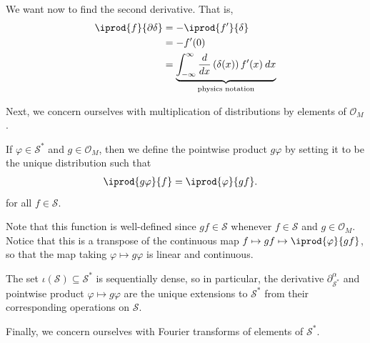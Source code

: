 \documentclass[10pt]{mypackage}
\begin{document}
\begin{example}
  We want now to find the second derivative. That is,
  \begin{align*}
    \iprod{f}{\partial \delta} &= - \iprod{f'}{\delta}\\
                               &= - f'(0)\\
                               &= \underbrace{\int_{-\infty}^{\infty} \frac{d}{dx}\left( \delta(x) \right)f'(x)\:dx}_{\text{physics notation}}
  \end{align*}
\end{example}
Next, we concern ourselves with multiplication of distributions by elements of $\mathcal{O}_M$. 
\begin{definition}
  If $\varphi\in \mathcal{S}^{\ast}$ and $g\in \mathcal{O}_M$, then we define the pointwise product $g\varphi$ by setting it to be the unique distribution such that
  \begin{align*}
    \iprod{g\varphi}{f} &= \iprod{\varphi}{gf}.
  \end{align*}
  for all $f\in \mathcal{S}$.
\end{definition}
Note that this function is well-defined since $gf\in \mathcal{S}$ whenever $f\in \mathcal{S}$ and $g\in \mathcal{O}_M$. Notice that this is a transpose of the continuous map $f\mapsto gf \mapsto \iprod{\varphi}{gf}$, so that the map taking $\varphi\mapsto g\varphi$ is linear and continuous.
\begin{remark}
  The set $\iota\left( \mathcal{S} \right)\subseteq \mathcal{S}^{\ast}$ is sequentially dense, so in particular, the derivative $\partial^{\alpha}_{\mathcal{S}^{\ast}}$ and pointwise product $\varphi\mapsto g\varphi$ are the unique extensions to $\mathcal{S}^{\ast}$ from their corresponding operations on $\mathcal{S}$.
\end{remark}
Finally, we concern ourselves with Fourier transforms of elements of $\mathcal{S}^{\ast}$.
\end{document}
